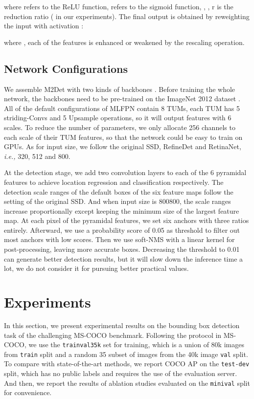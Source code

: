 \documentclass[letterpaper]{article} \usepackage{aaai18}  \usepackage{times}  \usepackage{helvet}  \usepackage{courier}  \usepackage{url}  \usepackage{graphicx}
\begin{document}
where  refers to the ReLU function,  refers to the sigmoid function,  , , r is the reduction ratio ( in our experiments). The final output is obtained by reweighting the input  with activation :

where , each of the features is enhanced or weakened by the rescaling operation.

\subsection{Network Configurations}
We assemble M2Det with two kinds of backbones \cite{SimonyanZ14a,HeZRS16}. Before training the whole network, the backbones need to be pre-trained on the ImageNet 2012 dataset \cite{RussakovskyDSKS15}. All of the default configurations of MLFPN contain 8 TUMs, each TUM has 5 striding-Convs and 5 Upsample operations, so it will output features with 6 scales. To reduce the number of parameters, we only allocate 256 channels to each scale of their TUM features, so that the network could be easy to train on GPUs. As for input size, we follow the original SSD, RefineDet and RetinaNet, \textit{i.e.,}  320, 512 and 800.

At the detection stage, we add two convolution layers to each of the 6 pyramidal features to achieve location regression and classification respectively. The detection scale ranges of the default boxes of the six feature maps follow the setting of the original SSD. And when input size is 800800, the scale ranges increase proportionally except keeping the minimum size of the largest feature map. At each pixel of the pyramidal features, we set six anchors with three ratios entirely. Afterward, we use a probability score of 0.05 as threshold to filter out most anchors with low scores. Then we use soft-NMS \cite{BodlaSCD17} with a linear kernel for post-processing, leaving more accurate boxes. Decreasing the threshold to 0.01 can generate better detection results, but it will slow down the inference time a lot, we do not consider it for pursuing better practical values.

\section{Experiments}
In this section, we present experimental results on the bounding box detection task of the challenging MS-COCO benchmark. Following the protocol in MS-COCO, we use the \texttt{trainval35k} set for training, which is a union of 80k images from \texttt{train} split and a random 35 subset of images from the 40k image \texttt{val} split. To compare with state-of-the-art methods, we report COCO AP on the \texttt{test-dev} split, which has no public labels and requires the use of the evaluation server. And then, we report the results of ablation studies evaluated on the \texttt{minival} split for convenience.
\end{document}
